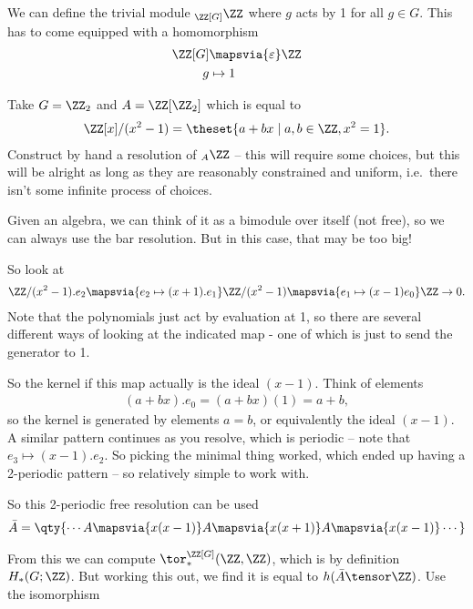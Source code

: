 We can define the trivial module \({}_{\ZZ[G]}\ZZ\) where \(g\) acts by
1 for all \(g\in G\). This has to come equipped with a homomorphism
\begin{align*}
\ZZ[G] &\mapsvia{\varepsilon} \ZZ \\
g &\mapsto 1
\end{align*}

\begin{example}

Take \(G=\ZZ_2\) and \(A = \ZZ[\ZZ_2]\) which is equal to
\begin{align*}
\ZZ[x] / (x^2-1) = \theset{a + bx\mid a,b\in \ZZ, x^2=1}
.\end{align*} Construct by hand a resolution of \({}_{A}\ZZ\) -- this
will require some choices, but this will be alright as long as they are
reasonably constrained and uniform, i.e.~there isn't some infinite
process of choices.

Given an algebra, we can think of it as a bimodule over itself (not
free), so we can always use the bar resolution. But in this case, that
may be too big!

So look at
\begin{align*}
\ZZ/(x^2-1).e_2 \mapsvia{e_2 \mapsto (x+1).e_1} \ZZ/(x^2-1) \mapsvia{e_1 \mapsto (x-1)e_0} \ZZ \to 0
.\end{align*} Note that the polynomials just act by evaluation at 1, so
there are several different ways of looking at the indicated map - one
of which is just to send the generator to 1.

So the kernel if this map actually is the ideal \((x-1)\). Think of
elements
\begin{align*} 
(a+bx).e_0 = (a+bx)(1) = a+b
,\end{align*} so the kernel is generated by elements \(a=b\), or
equivalently the ideal \((x-1)\). A similar pattern continues as you
resolve, which is periodic -- note that \(e_3 \mapsto (x-1).e_2\). So
picking the minimal thing worked, which ended up having a 2-periodic
pattern -- so relatively simple to work with.

So this 2-periodic free resolution can be used
\begin{align*}
\bar A = \qty{ \cdots A \mapsvia{x(x-1)} A \mapsvia{x(x+1)} A \mapsvia{x(x-1)} \cdots}
\end{align*}

From this we can compute \(\tor_*^{\ZZ[G]} (\ZZ, \ZZ)\), which is by
definition \(H_*(G;\ZZ)\). But working this out, we find it is equal to
\(h(\bar A \tensor \ZZ)\). Use the isomorphism


\end{example}
